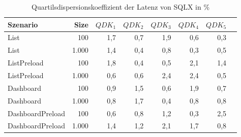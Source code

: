 
\begin{table}[ht]
\setlength{\extrarowheight}{-1pt}
\centering
\caption{Quartilsdispersionskoeffizient der Latenz von SQLX in \%}
\begin{tabular}{lrrrrrrr}
\toprule
Szenario & Size & ${QDK_1}$ & ${QDK_2}$ & ${QDK_3}$& ${QDK_4}$ & ${QDK_5}$ \\
\midrule
	List & 100 & \cellcolor{red!2}  1,7 & \cellcolor{red!1}  0,7 & \cellcolor{red!2}  1,9 & \cellcolor{red!1}  0,6 & \cellcolor{red!1}  0,3 \\
	List & 1.000 & \cellcolor{red!2}  1,4 & \cellcolor{red!1}  0,4 & \cellcolor{red!1}  0,8 & \cellcolor{red!1}  0,3 & \cellcolor{red!1}  0,5 \\
	ListPreload & 100 & \cellcolor{red!2}  1,8 & \cellcolor{red!1}  0,4 & \cellcolor{red!1}  0,5 & \cellcolor{red!3}  2,1 & \cellcolor{red!2}  1,4 \\
	ListPreload & 1.000 & \cellcolor{red!1}  0,6 & \cellcolor{red!1}  0,6 & \cellcolor{red!3}  2,4 & \cellcolor{red!3}  2,4 & \cellcolor{red!1}  0,5 \\
	Dashboard & 100 & \cellcolor{red!1}  0,9 & \cellcolor{red!2}  1,5 & \cellcolor{red!1}  0,6 & \cellcolor{red!2}  1,9 & \cellcolor{red!1}  0,7 \\
	Dashboard & 1.000 & \cellcolor{red!1}  0,8 & \cellcolor{red!2}  1,7 & \cellcolor{red!1}  0,4 & \cellcolor{red!1}  0,8 & \cellcolor{red!1}  0,8 \\
	DashboardPreload & 100 & \cellcolor{red!1}  0,6 & \cellcolor{red!1}  0,8 & \cellcolor{red!2}  1,2 & \cellcolor{red!1}  0,3 & \cellcolor{red!3}  2,5 \\
	DashboardPreload & 1.000 & \cellcolor{red!2}  1,4 & \cellcolor{red!2}  1,2 & \cellcolor{red!3}  2,1 & \cellcolor{red!2}  1,7 & \cellcolor{red!1}  0,8 \\
\bottomrule
\end{tabular}
\label{tab:quartilsdispersionskoeffizient_latenz_sqlx}
\end{table}
	